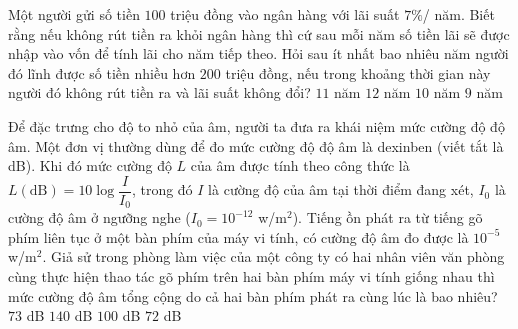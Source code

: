 \begin{ex}%
	Một người gửi số tiền $ 100$ triệu đồng vào ngân hàng với lãi suất $ 7 \%$/ năm. Biết rằng nếu không rút tiền ra khỏi ngân hàng thì cứ sau mỗi năm số tiền lãi sẽ được nhập vào vốn để  tính lãi cho năm tiếp theo. Hỏi sau ít nhất bao nhiêu năm người đó lĩnh được số tiền nhiều hơn $ 200$ triệu đồng, nếu trong khoảng thời gian này người đó không rút tiền ra và lãi suất không đổi?
	 \choice
		{\True  $ 11$ năm}
		{$ 12$ năm} 
		{$  10$ năm}
		{$ 9$ năm} 
\end{ex}

\begin{ex}%
	Để đặc trưng cho độ to nhỏ của âm, người ta đưa ra khái niệm mức cường độ độ âm. Một đơn vị thường dùng để đo mức cường độ độ âm là dexinben (viết tắt là dB). Khi đó mức cường độ $L$ của âm được tính theo công thức là $L(\text{dB}) = 10\log\dfrac{I}{I_0}$, trong đó $I$ là cường độ của âm tại thời điểm đang xét, $I_0$ là cường độ âm ở ngưỡng nghe ($I_0 = 10^{-12}$ w/m$^2$). Tiếng ồn phát ra từ tiếng gõ phím liên tục ở một bàn phím của máy vi tính, có cường độ âm đo được là $10^{-5}$ w/m$^2$. Giả sử trong phòng làm việc của một công ty có hai nhân viên văn phòng cùng thực hiện thao tác gõ phím trên hai bàn  phím máy vi tính giống nhau thì mức cường độ âm tổng cộng do cả hai bàn phím phát ra cùng lúc là bao nhiêu?
	\choice 
		{\True $73$ dB} 
		{$140$ dB} 
		 {$100$ dB}
		 {$72$ dB}
\end{ex}

